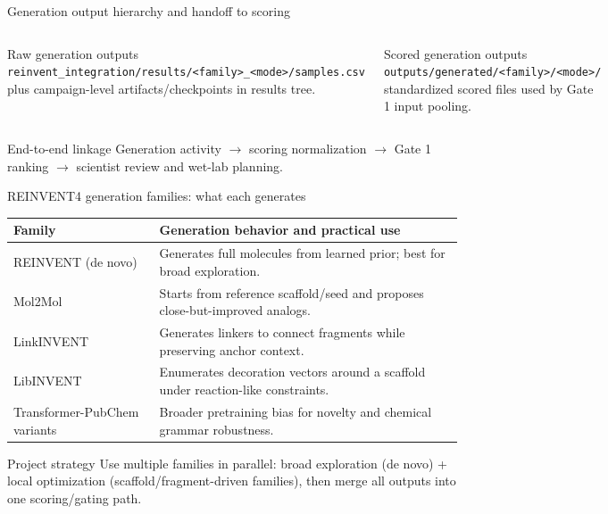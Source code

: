 \documentclass[aspectratio=169,10pt]{beamer}
\begin{document}
\begin{frame}{Generation output hierarchy and handoff to scoring}
  \small
  \begin{columns}[T]
      \begin{block}{Raw generation outputs}
        \texttt{reinvent\_integration/results/<family>\_<mode>/samples.csv}\\
        plus campaign-level artifacts/checkpoints in results tree.
      \end{block}
      \begin{block}{Scored generation outputs}
        \texttt{outputs/generated/<family>/<mode>/}\\
        standardized scored files used by Gate 1 input pooling.
      \end{block}
  \end{columns}

  \vspace{3pt}
  \begin{exampleblock}{End-to-end linkage}
    Generation activity \(\rightarrow\) scoring normalization \(\rightarrow\)
    Gate 1 ranking \(\rightarrow\) scientist review and wet-lab planning.
  \end{exampleblock}
\end{frame}

\begin{frame}{REINVENT4 generation families: what each generates}
  \small
  \begin{tabularx}{\textwidth}{lX}
    \toprule
    \textbf{Family} & \textbf{Generation behavior and practical use} \\
    \midrule
    REINVENT (de novo) & Generates full molecules from learned prior; best for broad exploration. \\
    Mol2Mol & Starts from reference scaffold/seed and proposes close-but-improved analogs. \\
    LinkINVENT & Generates linkers to connect fragments while preserving anchor context. \\
    LibINVENT & Enumerates decoration vectors around a scaffold under reaction-like constraints. \\
    Transformer-PubChem variants & Broader pretraining bias for novelty and chemical grammar robustness. \\
    \bottomrule
  \end{tabularx}

  \vspace{4pt}
  \begin{exampleblock}{Project strategy}
    Use multiple families in parallel: broad exploration (de novo) + local optimization
    (scaffold/fragment-driven families), then merge all outputs into one scoring/gating path.
  \end{exampleblock}
\end{frame}
\end{document}
